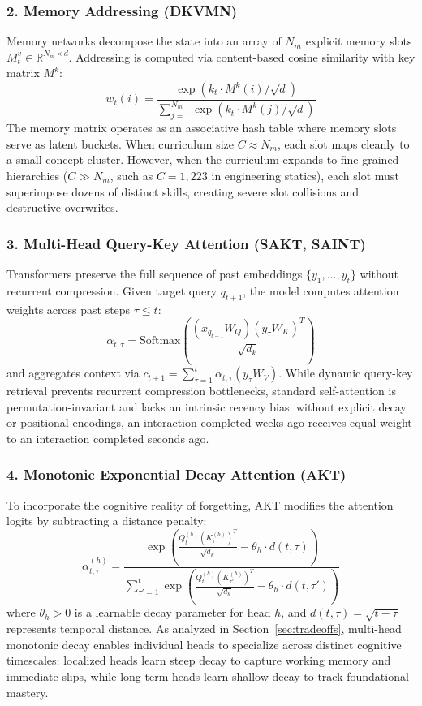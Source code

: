 \documentclass[11pt]{article}
\begin{document}
\subsubsection{2. Memory Addressing (DKVMN)}
Memory networks decompose the state into an array of $N_m$ explicit memory slots $M_t^v \in \mathbb{R}^{N_m \times d}$. Addressing is computed via content-based cosine similarity with key matrix $M^k$:
\begin{equation}
w_t(i) = \frac{\exp(k_t \cdot M^k(i) / \sqrt{d})}{\sum_{j=1}^{N_m} \exp(k_t \cdot M^k(j) / \sqrt{d})}
\end{equation}
The memory matrix operates as an associative hash table where memory slots serve as latent buckets. When curriculum size $C \approx N_m$, each slot maps cleanly to a small concept cluster. However, when the curriculum expands to fine-grained hierarchies ($C \gg N_m$, such as $C = 1,223$ in engineering statics), each slot must superimpose dozens of distinct skills, creating severe slot collisions and destructive overwrites.

\subsubsection{3. Multi-Head Query-Key Attention (SAKT, SAINT)}
Transformers preserve the full sequence of past embeddings $\{y_1, \dots, y_t\}$ without recurrent compression. Given target query $q_{t+1}$, the model computes attention weights across past steps $\tau \le t$:
\begin{equation}
\alpha_{t, \tau} = \text{Softmax}\left(\frac{(x_{q_{t+1}} W_Q)(y_\tau W_K)^T}{\sqrt{d_k}}\right)
\end{equation}
and aggregates context via $c_{t+1} = \sum_{\tau=1}^t \alpha_{t, \tau} (y_\tau W_V)$. While dynamic query-key retrieval prevents recurrent compression bottlenecks, standard self-attention is permutation-invariant and lacks an intrinsic recency bias: without explicit decay or positional encodings, an interaction completed weeks ago receives equal weight to an interaction completed seconds ago.

\subsubsection{4. Monotonic Exponential Decay Attention (AKT)}
To incorporate the cognitive reality of forgetting, AKT modifies the attention logits by subtracting a distance penalty:
\begin{equation}
\alpha_{t, \tau}^{(h)} = \frac{\exp\left(\frac{Q_t^{(h)} (K_\tau^{(h)})^T}{\sqrt{d_k}} - \theta_h \cdot d(t, \tau)\right)}{\sum_{\tau'=1}^t \exp\left(\frac{Q_t^{(h)} (K_{\tau'}^{(h)})^T}{\sqrt{d_k}} - \theta_h \cdot d(t, \tau')\right)}
\end{equation}
where $\theta_h > 0$ is a learnable decay parameter for head $h$, and $d(t, \tau) = \sqrt{t - \tau}$ represents temporal distance. As analyzed in Section~\ref{sec:tradeoffs}, multi-head monotonic decay enables individual heads to specialize across distinct cognitive timescales: localized heads learn steep decay to capture working memory and immediate slips, while long-term heads learn shallow decay to track foundational mastery.
\end{document}
